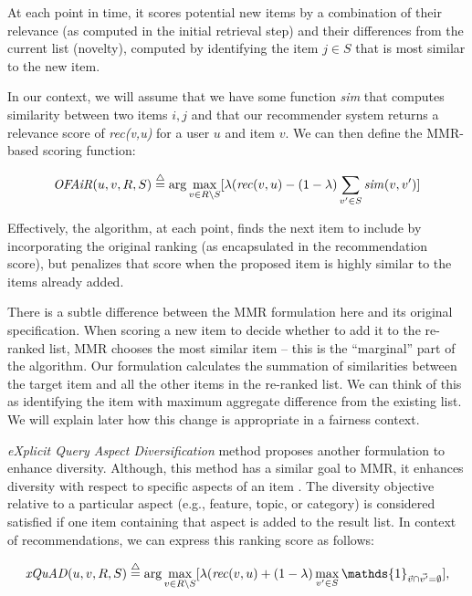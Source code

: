 At each point in time, it scores potential new items by a combination of their relevance (as computed in the initial retrieval step) and their differences from the current list (novelty), computed by identifying the item $j \in S$ that is most similar to the new item.

In our context, we will assume that we have some function \textit{sim} that computes similarity between two items $i, j$ and that our recommender system returns a relevance score of \textit{rec(v,u)} for a user $u$ and item $v$. We can then define the MMR-based scoring function:

\begin{equation}
    \mathit{OFAiR}(u,v,R,S)\buildrel\triangle\over= \arg\max_{v \in R \setminus S} [\lambda  (\mathit{rec}(v,u) - (1 - \lambda) \sum_{v' \in S} \mathit{sim}(v,v')]
\label{eq:mmr}
\end{equation}

Effectively, the algorithm, at each point, finds the next item to include by incorporating the original ranking (as encapsulated in the recommendation score), but penalizes that score when the proposed item is highly similar to the items already added.

There is a subtle difference between the MMR formulation here and its original specification. When scoring a new item to decide whether to add it to the re-ranked list, MMR chooses the most similar item -- this is the ``marginal'' part of the algorithm. Our formulation calculates the summation of similarities between the target item and all the other items in the re-ranked list. We can think of this as identifying the item with maximum aggregate difference from the existing list. We will explain later how this change is appropriate in a fairness context.

\textit{eXplicit Query Aspect Diversification} method proposes another formulation to enhance diversity. Although, this method has a similar goal to MMR, it enhances diversity with respect to specific aspects of an item \cite{santos2015search}. The diversity objective relative to a particular aspect (e.g., feature, topic, or category) is considered satisfied if one item containing that aspect is added to the result list. In context of recommendations, we can express this ranking score as follows:

\begin{equation}
    \mathit{xQuAD}(u,v,R,S)\buildrel\triangle\over= \arg\max_{v \in R \setminus S} [\lambda  (\mathit{rec}(v,u) + (1 - \lambda) \max_{v' \in S} \mathds{1}_{\vec{v} \cap \Vec{v'} = \emptyset}],
\label{eq:xquad}
\end{equation}

